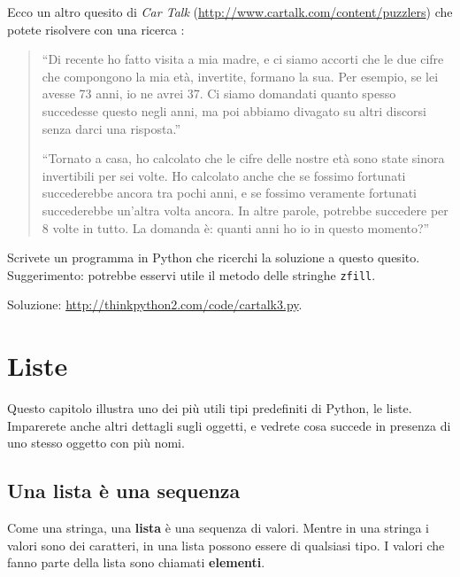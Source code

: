 \documentclass[10pt]{book}
\begin{document}
\vspace{0.2in}
\begin{exercise}
Ecco un altro quesito di {\em Car Talk} (\url{http://www.cartalk.com/content/puzzlers}) che potete risolvere con una ricerca :

\begin{quote}
``Di recente ho fatto visita a mia madre, e ci siamo accorti che le due cifre che compongono la mia età, invertite, formano la sua. Per esempio, se lei avesse 73 anni, io ne avrei 37. Ci siamo domandati quanto spesso succedesse questo negli anni, ma poi abbiamo divagato su altri discorsi senza darci una risposta.''

``Tornato a casa, ho calcolato che le cifre delle nostre età sono state sinora invertibili per sei volte. Ho calcolato anche che se fossimo fortunati succederebbe ancora tra pochi anni, e se fossimo veramente fortunati succederebbe un'altra volta ancora. In altre parole, potrebbe succedere per 8 volte in tutto. La domanda è: quanti anni ho io in questo momento?''

\end{quote}

Scrivete un programma in Python che ricerchi la soluzione a questo quesito. Suggerimento: potrebbe esservi utile il metodo delle stringhe {\tt zfill}.

Soluzione: \url{http://thinkpython2.com/code/cartalk3.py}.

\end{exercise}



\chapter{Liste}

Questo capitolo illustra uno dei più utili tipi predefiniti di Python, le liste. Imparerete anche altri dettagli sugli oggetti, e vedrete cosa succede in presenza di uno stesso oggetto con più nomi.

\section{Una lista è una sequenza}
\label{sequence}

Come una stringa, una {\bf lista} è una sequenza di valori. Mentre in una stringa i valori sono dei caratteri, in una lista possono essere di qualsiasi tipo. I valori che fanno parte della lista sono chiamati {\bf elementi}.
\end{document}
